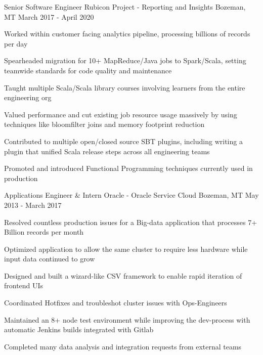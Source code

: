 \begin{cventries}
  \cventry
    {Senior Software Engineer} %
    {Rubicon Project - Reporting and Insights} %
    {Bozeman, MT} %
    {March 2017 - April 2020} %
    {
      \begin{cvitems} %
        \item{Worked within customer facing analytics pipeline, processing billions of records per day}
        \item{Spearheaded migration for 10+ MapReduce/Java jobs to Spark/Scala, setting teamwide standards for code quality and maintenance}
        \item{Taught multiple Scala/Scala library courses involving learners from the entire engineering org}
        \item{Valued performance and cut existing job resource usage massively by using techniques like bloomfilter joins and memory footprint reduction}
        \item{Contributed to multiple open/closed source SBT plugins, including writing a plugin that unified Scala release steps across all engineering teams}
        \item{Promoted and introduced Functional Programming techniques currently used in production}
      \end{cvitems}
    }


  \cventry
    {Applications Engineer \& Intern} %
    {Oracle - Oracle Service Cloud} %
    {Bozeman, MT} %
    {May 2013 - March 2017} %
    {
      \begin{cvitems} %
        \item {Resolved countless production issues for a Big-data application that processes 7+ Billion records per month}
        \item {Optimized application to allow the same cluster to require less hardware while input data continued to grow}
        \item {Designed and built a wizard-like CSV framework to enable rapid iteration of frontend UIs}
        \item {Coordinated Hotfixes and troubleshot cluster issues with Ops-Engineers}
        \item {Maintained an 8+ node test environment while improving the dev-process with automatic Jenkins builds integrated with Gitlab}
        \item {Completed many data analysis and integration requests from external teams}
      \end{cvitems}
    }

\end{cventries}
